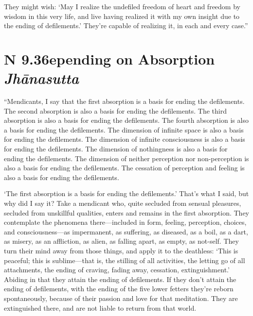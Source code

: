 \documentclass[12pt,openany]{book}%
\newcommand*{\suttatitleacronym}[1]{\smaller[2]{#1}\vspace*{.3em}}
\newcommand*{\suttatitletranslation}[1]{\linebreak{#1}}
\newcommand*{\suttatitleroot}[1]{\linebreak\smaller[2]\itshape{#1}}
\newcommand*{\tocacronym}[1]{\hspace*{-3.3em}{#1}\quad}
\newcommand*{\toctranslation}[1]{#1}
\newcommand*{\tocroot}[1]{(\textit{#1})}
\begin{document}
They might wish: ‘May I realize the undefiled freedom of heart and freedom by wisdom in this very life, and live having realized it with my own insight due to the ending of defilements.’ They’re capable of realizing it, in each and every case.” 

%
\section*{{\suttatitleacronym AN 9.36}{\suttatitletranslation Depending on Absorption }{\suttatitleroot Jhānasutta}}
\addcontentsline{toc}{section}{\tocacronym{AN 9.36} \toctranslation{Depending on Absorption } \tocroot{Jhānasutta}}

“Mendicants, I say that the first absorption is a basis for ending the defilements. The second absorption is also a basis for ending the defilements. The third absorption is also a basis for ending the defilements. The fourth absorption is also a basis for ending the defilements. The dimension of infinite space is also a basis for ending the defilements. The dimension of infinite consciousness is also a basis for ending the defilements. The dimension of nothingness is also a basis for ending the defilements. The dimension of neither perception nor non-perception is also a basis for ending the defilements. The cessation of perception and feeling is also a basis for ending the defilements. 

‘The first absorption is a basis for ending the defilements.’ That’s what I said, but why did I say it? Take a mendicant who, quite secluded from sensual pleasures, secluded from unskillful qualities, enters and remains in the first absorption. They contemplate the phenomena there—included in form, feeling, perception, choices, and consciousness—as impermanent, as suffering, as diseased, as a boil, as a dart, as misery, as an affliction, as alien, as falling apart, as empty, as not-self. They turn their mind away from those things, and apply it to the deathless: ‘This is peaceful; this is sublime—that is, the stilling of all activities, the letting go of all attachments, the ending of craving, fading away, cessation, extinguishment.’ Abiding in that they attain the ending of defilements. If they don’t attain the ending of defilements, with the ending of the five lower fetters they’re reborn spontaneously, because of their passion and love for that meditation. They are extinguished there, and are not liable to return from that world. 
\end{document}
